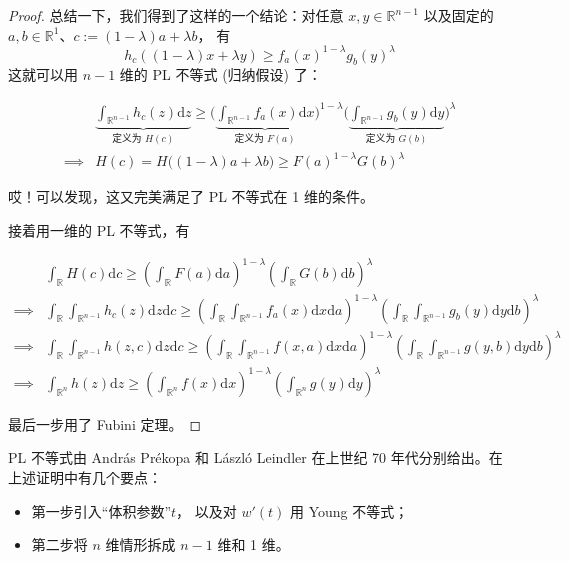 \begin{proof}
总结一下，我们得到了这样的一个结论：对任意 $x,y\in\mathbb{R}^{n-1}$ 以及固定的 $a,b\in\mathbb{R}^1$、$c:=(1-\lambda)a+\lambda b$， 有
\[
h_c((1-\lambda)x+\lambda y)\ge f_a(x)^{1-\lambda}g_b(y)^\lambda
\]
这就可以用 $n-1$ 维的 PL 不等式 (归纳假设) 了：
 
\begin{align*}
&\underbrace{\int_{\mathbb{R}^{n-1}}h_c(z)\mathrm{d}z}_{\text{定义为 }H(c)}\ge\bigg(\underbrace{\int_{\mathbb{R}^{n-1}}f_a(x)\mathrm{d}x}_{\text{定义为 }F(a)}\bigg)^{1-\lambda}\bigg(\underbrace{\int_{\mathbb{R}^{n-1}} g_b(y)\mathrm{d}y}_{\text{定义为 }G(b)}\bigg)^\lambda\\
\implies & H(c)=H\big((1-\lambda)a+\lambda b\big)\ge F(a)^{1-\lambda}G(b)^\lambda
\end{align*}
 
哎！可以发现，这又完美满足了 PL 不等式在 1 维的条件。

接着用一维的 PL 不等式，有
 
\begin{align*}
&\int_{\mathbb{R}}H(c)\mathrm{d}c\ge\left(\int_{\mathbb{R}} F(a)\mathrm{d}a\right)^{1-\lambda}\left(\int_{\mathbb{R}} G(b)\mathrm{d}b\right)^\lambda\\
\implies & \int_{\mathbb{R}}\int_{\mathbb{R}^{n-1}}h_c(z)\mathrm{d}z\mathrm{d}c\ge\left(\int_{\mathbb{R}}\int_{\mathbb{R}^{n-1}}f_a(x)\mathrm{d}x\mathrm{d}a\right)^{1-\lambda}\left(\int_{\mathbb{R}}\int_{\mathbb{R}^{n-1}}g_b(y)\mathrm{d}y\mathrm{d}b\right)^\lambda\\
\implies & \int_{\mathbb{R}}\int_{\mathbb{R}^{n-1}}h(z,c)\mathrm{d}z\mathrm{d}c\ge\left(\int_{\mathbb{R}}\int_{\mathbb{R}^{n-1}}f(x,a)\mathrm{d}x\mathrm{d}a\right)^{1-\lambda}\left(\int_{\mathbb{R}}\int_{\mathbb{R}^{n-1}}g(y,b)\mathrm{d}y\mathrm{d}b\right)^\lambda\\
\implies & \int_{\mathbb{R}^n}h(z)\mathrm{d}z\ge \left(\int_{\mathbb{R}^n}f(x)\mathrm{d}x\right)^{1-\lambda}\left(\int_{\mathbb{R}^n}g(y)\mathrm{d}y\right)^\lambda
\end{align*}
 
最后一步用了 Fubini 定理。%
\end{proof}


PL 不等式由 András Prékopa 和 László Leindler 在上世纪 70 年代分别给出。在上述证明中有几个要点：

\begin{itemize}
\item 第一步引入“体积参数”$t$， 以及对 $w'(t)$ 用 Young 不等式；
\item 第二步将 $n$ 维情形拆成 $n-1$ 维和 1 维。
\end{itemize}

